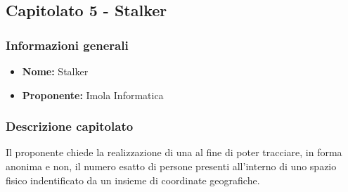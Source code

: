 \subsection{Capitolato 5 - Stalker}

	\subsubsection{Informazioni generali}
		\begin{itemize}
			\item \textbf{Nome:} Stalker
			\item \textbf{Proponente:} Imola Informatica
		\end{itemize}

	\subsubsection{Descrizione capitolato}
		Il proponente chiede la realizzazione di una  al fine di poter tracciare, in forma anonima e non, il numero esatto di persone presenti all'interno di uno spazio fisico indentificato da un insieme di coordinate geografiche.

